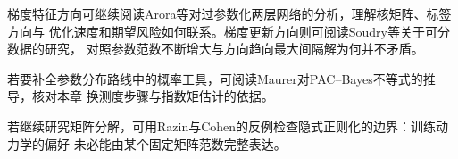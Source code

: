 梯度特征方向可继续阅读Arora等对过参数化两层网络的分析，理解核矩阵、标签方向与
优化速度和期望风险如何联系。梯度更新方向则可阅读Soudry等关于可分数据的研究，
对照参数范数不断增大与方向趋向最大间隔解为何并不矛盾。

若要补全参数分布路线中的概率工具，可阅读Maurer对PAC--Bayes不等式的推导，核对本章
换测度步骤与指数矩估计的依据。

若继续研究矩阵分解，可用Razin与Cohen的反例检查隐式正则化的边界：训练动力学的偏好
未必能由某个固定矩阵范数完整表达。
